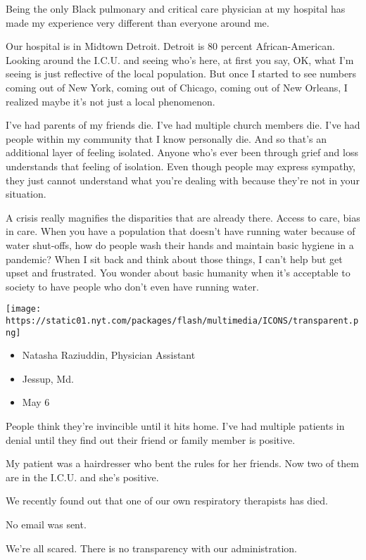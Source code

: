 Being the only Black pulmonary and critical care physician at my
hospital has made my experience very different than everyone around me.

Our hospital is in Midtown Detroit. Detroit is 80 percent
African-American. Looking around the I.C.U. and seeing who's here, at
first you say, OK, what I'm seeing is just reflective of the local
population. But once I started to see numbers coming out of New York,
coming out of Chicago, coming out of New Orleans, I realized maybe it's
not just a local phenomenon.

I've had parents of my friends die. I've had multiple church members
die. I've had people within my community that I know personally die. And
so that's an additional layer of feeling isolated. Anyone who's ever
been through grief and loss understands that feeling of isolation. Even
though people may express sympathy, they just cannot understand what
you're dealing with because they're not in your situation.

A crisis really magnifies the disparities that are already there. Access
to care, bias in care. When you have a population that doesn't have
running water because of water shut-offs, how do people wash their hands
and maintain basic hygiene in a pandemic? When I sit back and think
about those things, I can't help but get upset and frustrated. You
wonder about basic humanity when it's acceptable to society to have
people who don't even have running water.

\texttt{[image: https://static01.nyt.com/packages/flash/multimedia/ICONS/transparent.png]}

\begin{itemize}
\tightlist
\item
  Natasha Raziuddin, Physician Assistant
\item
  Jessup, Md.
\item
  May 6
\end{itemize}

People think they're invincible until it hits home. I've had multiple
patients in denial until they find out their friend or family member is
positive.

My patient was a hairdresser who bent the rules for her friends. Now two
of them are in the I.C.U. and she's positive.

We recently found out that one of our own respiratory therapists has
died.

No email was sent.

We're all scared. There is no transparency with our administration.

